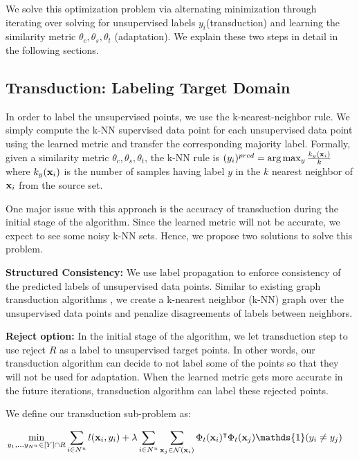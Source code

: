 We solve this optimization problem via alternating minimization through iterating over solving for unsupervised labels $y_i$(transduction) and learning the similarity metric $\theta_c,\theta_s,\theta_t$ (adaptation). We explain these two steps in detail in the following sections.







\subsection{Transduction: Labeling Target Domain}
\label{label}
In order to label the unsupervised points, we use the k-nearest-neighbor rule. We simply compute the k-NN supervised data point for each unsupervised data point using the learned metric and transfer the corresponding majority label. Formally, given a similarity metric $\theta_c, \theta_s, \theta_t$, the k-NN rule is 
$(y_i)^{pred} = \arg\max_y \frac{k_y(\mathbf{x}_i)}{k}$ where $k_y(\mathbf{x}_i)$ is the number of samples having label $y$ in the $k$ nearest neighbor of $\mathbf{x}_i$ from the source set. 

One major issue with this approach is the accuracy of transduction during the initial stage of the algorithm. Since the learned metric will not be accurate, we expect to see some noisy k-NN sets. Hence, we propose two solutions to solve this problem.

\textbf{Structured Consistency:} We use label propagation to enforce consistency of the predicted labels of unsupervised data points. Similar to existing graph transduction algorithms \cite{label_prop1,label_prop2}, we create a k-nearest neighbor (k-NN) graph over the unsupervised data points and penalize disagreements of labels between neighbors.

\textbf{Reject option:} In the initial stage of the algorithm, we let transduction step to use reject $R$ as a label to unsupervised target points. In other words, our transduction algorithm can decide to not label some of the points so that they will not be used for adaptation. When the learned metric gets more accurate in the future iterations, transduction algorithm can label these rejected points.

We define our transduction sub-problem as:

\begin{equation}
\begin{aligned}
\min_{y_1, \ldots y_{N^u} \in [Y] \cap R}  &\sum_{i \in N^u} l(\xui, y_i) + \lambda \sum_{i \in N^u} \sum_{\xuj \in \mathcal{N}(\xui)} \Phi_t(\xui)^\intercal \Phi_t(\xuj)\mathds{1}(y_i \neq y_j)
\end{aligned}
\label{robtran}
\end{equation}


